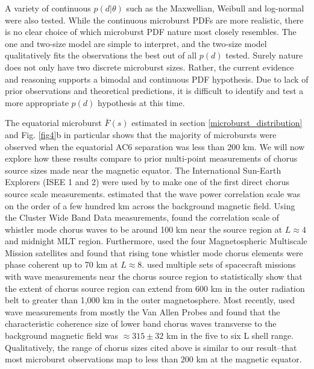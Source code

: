 \documentclass[draft]{agujournal2019}
\begin{document}
A variety of continuous $p(d | \theta)$ such as the Maxwellian, Weibull and log-normal were also tested. While the continuous microburst PDFs are more realistic, there is no clear choice of which microburst PDF nature most closely resembles. The one and two-size model are simple to interpret, and the two-size model qualitatively fits the observations the best out of all $p(d)$ tested. Surely nature does not only have two discrete microburst sizes. Rather, the current evidence and reasoning supports a bimodal and continuous PDF hypothesis. Due to lack of prior observations and theoretical predictions, it is difficult to identify and test a more appropriate $p(d)$ hypothesis at this time.

The equatorial microburst $\bar{F}(s)$ estimated in section \ref{microburst_distribution} and Fig. \ref{fig4}b in particular shows that the majority of microbursts were observed when the equatorial AC6 separation was less than $200$ km. We will now explore how these results compare to prior multi-point measurements of chorus source sizes made near the magnetic equator. The International Sun-Earth Explorers (ISEE 1 and 2) were used by  to make one of the first direct chorus source scale measurements.  estimated that the wave power correlation scale was on the order of a few hundred km across the background magnetic field. Using the Cluster Wide Band Data measurements,  found the correlation scale of whistler mode chorus waves to be around 100 km near the source region at $L \approx 4$ and midnight MLT region. Furthermore,  used the four Magnetospheric Multiscale Mission satellites and found that rising tone whistler mode chorus elements were phase coherent up to 70 km at $L \approx 8$.  used multiple sets of spacecraft missions with wave measurements near the chorus source region to statistically show that the extent of chorus source region can extend from 600 km in the outer radiation belt to greater than 1,000 km in the outer magnetosphere. Most recently,  used wave measurements from mostly the Van Allen Probes and found that the characteristic coherence size of lower band chorus waves transverse to the background magnetic field was $\approx 315 \pm 32$ km in the five to six L shell range. Qualitatively, the range of chorus sizes cited above is similar to our result--that most microburst observations map to less than 200 km at the magnetic equator.
\end{document}
